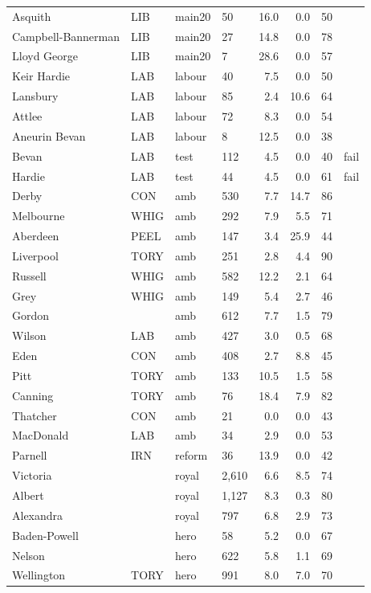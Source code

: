 \documentclass[11pt,a4paper]{article}
\begin{document}
\begin{small}
\begin{longtable}{llllrrrr}
Asquith & LIB & main20 & 50 & 16.0 & 0.0 & 50 & \\
Campbell-Bannerman & LIB & main20 & 27 & 14.8 & 0.0 & 78 & \\
Lloyd George & LIB & main20 & 7 & 28.6 & 0.0 & 57 & \\
Keir Hardie & LAB & labour & 40 & 7.5 & 0.0 & 50 & \\
Lansbury & LAB & labour & 85 & 2.4 & 10.6 & 64 & \\
Attlee & LAB & labour & 72 & 8.3 & 0.0 & 54 & \\
Aneurin Bevan & LAB & labour & 8 & 12.5 & 0.0 & 38 & \\
Bevan & LAB & test & 112 & 4.5 & 0.0 & 40 & fail\\
Hardie & LAB & test & 44 & 4.5 & 0.0 & 61 & fail\\
Derby & CON & amb & 530 & 7.7 & 14.7 & 86 & \\
Melbourne & WHIG & amb & 292 & 7.9 & 5.5 & 71 & \\
Aberdeen & PEEL & amb & 147 & 3.4 & 25.9 & 44 & \\
Liverpool & TORY & amb & 251 & 2.8 & 4.4 & 90 & \\
Russell & WHIG & amb & 582 & 12.2 & 2.1 & 64 & \\
Grey & WHIG & amb & 149 & 5.4 & 2.7 & 46 & \\
Gordon &  & amb & 612 & 7.7 & 1.5 & 79 & \\
Wilson & LAB & amb & 427 & 3.0 & 0.5 & 68 & \\
Eden & CON & amb & 408 & 2.7 & 8.8 & 45 & \\
Pitt & TORY & amb & 133 & 10.5 & 1.5 & 58 & \\
Canning & TORY & amb & 76 & 18.4 & 7.9 & 82 & \\
Thatcher & CON & amb & 21 & 0.0 & 0.0 & 43 & \\
MacDonald & LAB & amb & 34 & 2.9 & 0.0 & 53 & \\
Parnell & IRN & reform & 36 & 13.9 & 0.0 & 42 & \\
Victoria &  & royal & 2,610 & 6.6 & 8.5 & 74 & \\
Albert &  & royal & 1,127 & 8.3 & 0.3 & 80 & \\
Alexandra &  & royal & 797 & 6.8 & 2.9 & 73 & \\
Baden-Powell &  & hero & 58 & 5.2 & 0.0 & 67 & \\
Nelson &  & hero & 622 & 5.8 & 1.1 & 69 & \\
Wellington & TORY & hero & 991 & 8.0 & 7.0 & 70 & \\

\end{longtable}
\end{small}
\end{document}
